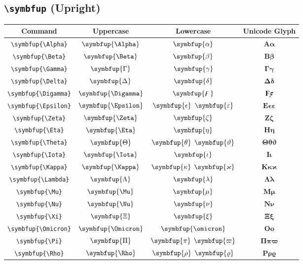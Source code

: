 \documentclass[12pt,a4paper]{article}
\begin{document}
\subsection*{\texttt{\textbackslash{}symbfup} (Upright)}

\begin{longtable}{|c|c|c|c|}
\hline
\textbf{Command} & \textbf{Uppercase} & \textbf{Lowercase} & \textbf{Unicode Glyph} \\
\hline
\verb|\symbfup{\Alpha}| & $\symbfup{\Alpha}$ & $\symbfup{\alpha}$ & $ 𝚨 𝛂 $ \\
\verb|\symbfup{\Beta}| & $\symbfup{\Beta}$ & $\symbfup{\beta}$ & $ 𝚩 𝛃 $ \\
\verb|\symbfup{\Gamma}| & $\symbfup{\Gamma}$ & $\symbfup{\gamma}$ & $ 𝚪 𝛄 $ \\
\verb|\symbfup{\Delta}| & $\symbfup{\Delta}$ & $\symbfup{\delta}$ & $ 𝚫 𝛅 $ \\
\verb|\symbfup{\Digamma}| & $\symbfup{\Digamma}$ & $\symbfup{\digamma}$ & $ 𝟊 𝟋 $ \\
\verb|\symbfup{\Epsilon}| & $\symbfup{\Epsilon}$ & $\symbfup{\epsilon}$ $\symbfup{\varepsilon}$ & $ 𝚬 𝛜 𝛆 $ \\
\verb|\symbfup{\Zeta}| & $\symbfup{\Zeta}$ & $\symbfup{\zeta}$ & $ 𝚭 𝛇 $ \\
\verb|\symbfup{\Eta}| & $\symbfup{\Eta}$ & $\symbfup{\eta}$ & $ 𝚮 𝛈 $ \\
\verb|\symbfup{\Theta}| & $\symbfup{\Theta}$ & $\symbfup{\theta}$ $\symbfup{\vartheta}$ & $ 𝚯 𝛉 𝛝 $ \\
\verb|\symbfup{\Iota}| & $\symbfup{\Iota}$ & $\symbfup{\iota}$ & $ 𝚰 𝛊 $ \\
\verb|\symbfup{\Kappa}| & $\symbfup{\Kappa}$ & $\symbfup{\kappa}$ $\symbfup{\varkappa}$ & $ 𝚱 𝛋 𝛞 $ \\
\verb|\symbfup{\Lambda}| & $\symbfup{\Lambda}$ & $\symbfup{\lambda}$ & $ 𝚲 𝛌 $ \\
\verb|\symbfup{\Mu}| & $\symbfup{\Mu}$ & $\symbfup{\mu}$ & $ 𝚳 𝛍 $ \\
\verb|\symbfup{\Nu}| & $\symbfup{\Nu}$ & $\symbfup{\nu}$ & $ 𝚴 𝛎 $ \\
\verb|\symbfup{\Xi}| & $\symbfup{\Xi}$ & $\symbfup{\xi}$ & $ 𝚵 𝛏 $ \\
\verb|\symbfup{\Omicron}| & $\symbfup{\Omicron}$ & $\symbfup{\omicron}$ & $ 𝚶 𝛐 $ \\
\verb|\symbfup{\Pi}| & $\symbfup{\Pi}$ & $\symbfup{\pi}$ $\symbfup{\varpi}$ & $ 𝚷 𝛑 𝛡 $ \\
\verb|\symbfup{\Rho}| & $\symbfup{\Rho}$ & $\symbfup{\rho}$ $\symbfup{\varrho}$ & $ 𝚸 𝛒 𝛠 $ \\

\end{longtable}
\end{document}
